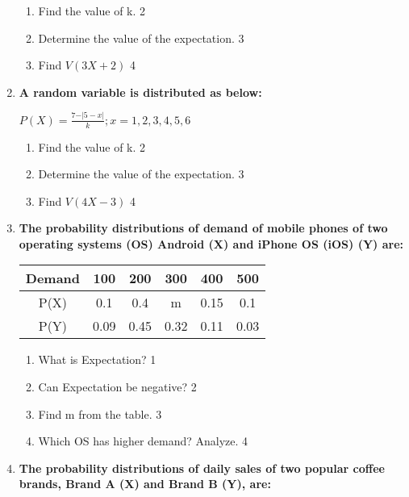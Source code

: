 \documentclass[a4paper,oneside, margin=1.4in]{book}
\begin{document}
\begin{enumerate}
\begin{enumerate}
  \item
  	Find the value of k. \hfill 2
  \item
  	Determine the value of the expectation. \hfill 3
  \item
  	Find $V(3X+2)$ \hfill 4
\end{enumerate}

\item \textbf{A random variable is distributed as below:}

\begin{center}
  \textbf{$P(X) = \frac{7-\vert 5-x\vert}{k}; x=1,2,3,4,5,6$}
\end{center}

\begin{enumerate}
  \item
  	Find the value of k. \hfill 2
  \item
  	Determine the value of the expectation. \hfill 3
  \item
  	Find $V(4X-3)$ \hfill 4
\end{enumerate}

  
   \item
	  \textbf{The probability distributions of demand of mobile phones of two 
	  operating systems (OS) Android (X) and iPhone OS (iOS) (Y) are:} 
	  
	    \begin{table}[h]
	    	  \begin{center}
\begin{tabular}{c|c|c|c|c|c}
Demand & 100  & 200  & 300  & 400  & 500  \\ \hline
P(X)   & 0.1  & 0.4  & m    & 0.15 & 0.1  \\ \hline
P(Y)   & 0.09 & 0.45 & 0.32 & 0.11 & 0.03
\end{tabular}
	  \end{center}
\end{table}
  
  \begin{enumerate}
    \item
	What is Expectation? \hfill 1
    \item
	Can Expectation be negative? \hfill 2
    \item  
	Find m from the table. \hfill 3
    \item
	Which OS has higher demand? Analyze. \hfill 4
  \end{enumerate}
  
  \item
	  \textbf{The probability distributions of daily sales of two popular coffee brands, Brand A (X) and Brand B (Y), are:} 
	  

\end{enumerate}
\end{document}
